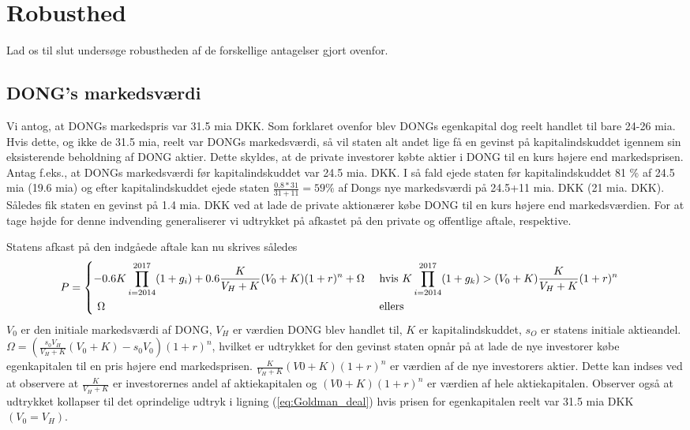 \documentclass{article}
\begin{document}
\section{Robusthed}
\label{sec:antag}
Lad os til slut undersøge robustheden af de forskellige antagelser gjort ovenfor. 

\subsection{DONG's markedsværdi}

Vi antog, at DONGs markedspris var 31.5 mia DKK. Som forklaret ovenfor blev DONGs egenkapital dog reelt handlet til bare 24-26 mia. Hvis dette, og ikke de 31.5 mia, reelt var DONGs markedsværdi, så vil staten alt andet lige få en gevinst på kapitalindskuddet igennem sin eksisterende beholdning af DONG aktier. Dette skyldes, at de private investorer købte aktier i DONG til en kurs højere end markedsprisen. Antag f.eks., at DONGs markedsværdi før kapitalindskuddet var 24.5 mia. DKK. I så fald ejede staten før kapitalindskuddet 81 \% af 24.5 mia (19.6 mia) og efter kapitalindskuddet ejede staten $\frac{0.8*31}{31+11}=59 \%$ af Dongs nye markedsværdi på 24.5+11 mia. DKK (21 mia. DKK). Således fik staten en gevinst på 1.4 mia. DKK  ved at lade de private aktionærer købe DONG til en kurs højere end markedsværdien. 
For at tage højde for denne indvending generaliserer vi udtrykket på afkastet på den private og offentlige aftale, respektive. 

Statens afkast på den indgåede aftale kan nu skrives således
\begin{align}
&P= 
\begin{dcases} 
-0.6K \prod_{i=2014}^{2017} (1+g_i)+0.6\frac{K}{V_H+K}(V_0+K)(1+r)^n +\Omega &\text{     hvis    } K\prod_{i=2014}^{2017}(1+g_k)>(V_0+K)\frac{K}{V_H+K}(1+r)^n \\
\text{ $\Omega$} &\text{  ellers }
\end {dcases} 
\label{eq:Goldman_deal_mod}
\end{align}
$V_0$ er den initiale markedsværdi af DONG, $V_H$ er værdien DONG blev handlet til, $K$ er kapitalindskuddet, $s_O$ er statens initiale aktieandel. $\Omega=\left(\frac{s_0 V_H}{V_H+K}(V_0+K)-s_0V_0 \right) (1+r)^n$, hvilket er udtrykket for den gevinst staten opnår på at lade de nye investorer købe egenkapitalen til en pris højere end markedsprisen. $\frac{K}{V_H+K}(V0+K)(1+r)^n $ er værdien af de nye investorers aktier. Dette kan indses ved at observere at $\frac{K}{V_H+K}$ er investorernes andel af aktiekapitalen og $(V0+K)(1+r)^n$ er værdien af hele aktiekapitalen. Observer også at udtrykket kollapser til det oprindelige udtryk i ligning (\ref{eq:Goldman_deal}) hvis prisen for egenkapitalen reelt var 31.5 mia DKK $(V_0=V_H)$.
\end{document}
